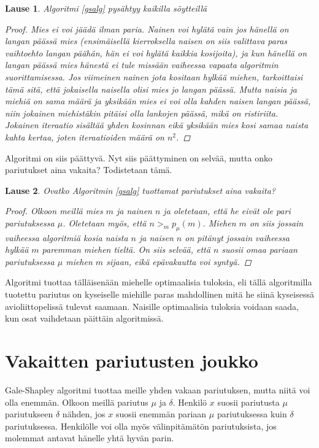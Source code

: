 \documentclass[finnish]{tktltiki2}
\newtheorem{lau}{Lause}
\theoremstyle{definition}
\theoremstyle{remark}
\begin{document}
\begin{lau}
Algoritmi \ref{gsalg} pysähtyy kaikilla söytteillä
\begin{proof}
Mies ei voi jäädä ilman paria. Nainen voi hylätä vain jos hänellä on langan päässä mies (ensimäisellä kierroksella naisen on siis valittava paras vaihtoehto langan päähän, hän ei voi hylätä kaikkia kosijoita), ja kun hänellä on langan päässä mies hänestä ei tule missään vaiheessa vapaata algoritmin suorittamisessa.
Jos viimeinen nainen jota kositaan hylkää miehen, tarkoittaisi tämä sitä, että jokaisella naisella olisi mies jo langan päässä. Mutta naisia ja miehiä on sama määrä ja yksikään mies ei voi olla kahden naisen langan päässä, niin jokainen miehistäkin pitäisi olla lankojen päässä, mikä on ristiriita.
Jokainen iteraatio sisältää yhden kosinnan eikä yksikään mies kosi samaa naista kahta kertaa, joten iteraatioiden määrä on $n^2$.
\end{proof}
\end{lau}
Algoritmi on siis päättyvä. Nyt siis päättyminen on selvää, mutta onko pariutukset aina vakaita?
Todistetaan tämä.
\begin{lau}
Ovatko Algoritmin \ref{gsalg} tuottamat pariutukset aina vakaita?
\begin{proof}\cite[p. 588]{gale62a}
Olkoon meillä mies $m$ ja nainen $n$ ja oletetaan, että he eivät ole pari pariutuksessa $\mu$. Oletetaan myös, että $n >_{m} p_{\mu}(m)$. Miehen $m$ on siis jossain vaiheessa algoritmiä kosia naista $n$ ja naisen $n$ on pitänyt jossain vaiheessa hylkää $m$ paremman miehen tieltä. On siis selvää, että $n$ suosii omaa pariaan pariutuksessa $\mu$ miehen $m$ sijaan, eikä epävakautta voi syntyä.
\end{proof}
\end{lau}
Algoritmi tuottaa tälläisenään miehelle optimaalisia tuloksia, eli tällä algoritmilla tuotettu pariutus on kyseiselle miehille paras mahdollinen mitä he siinä kyseisessä avioliittopelissä tulevat saamaan.
Naisille optimaalisia tuloksia voidaan saada, kun osat vaihdetaan päittäin algoritmissä.

\section{Vakaitten pariutusten joukko}
Gale-Shapley algoritmi tuottaa meille yhden vakaan pariutuksen, mutta niitä voi olla enemmän.
Olkoon meillä pariutus $\mu$ ja $\delta$. Henkilö $x$ suosii pariutusta $\mu$ pariutukseen $\delta$ nähden, jos $x$ suosii enemmän pariaan $\mu$ pariutuksessa kuin $\delta$ pariutuksessa. Henkilölle voi olla myös välinpitämätön pariutuksista, jos molemmat antavat hänelle yhtä hyvän parin.
\end{document}
